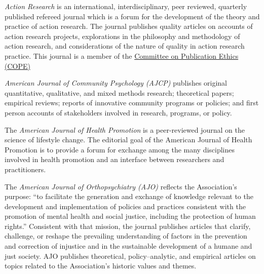 \documentclass[]{tufte-handout}
\providecommand{\tightlist}{%
  \setlength{\itemsep}{0pt}\setlength{\parskip}{0pt}}
\begin{document}
\begin{description}
\tightlist
\item[\href{http://arj.sagepub.com/}{\textsc{Action Research}}.]
\emph{Action Research} is an international, interdisciplinary, peer
reviewed, quarterly published refereed journal which is a forum for the
development of the theory and practice of action research. The journal
publishes quality articles on accounts of action research projects,
explorations in the philosophy and methodology of action research, and
considerations of the nature of quality in action research practice.
This journal is a member of the
\href{http://publicationethics.org/about}{Committee on Publication
Ethics (COPE)}
\item[\href{http://www.scra27.org/publications/ajcp/}{\textsc{American Journal of Community Psychology}}.]
\emph{American Journal of Community Psychology (AJCP)} publishes
original quantitative, qualitative, and mixed methods research;
theoretical papers; empirical reviews; reports of innovative community
programs or policies; and first person accounts of stakeholders involved
in research, programs, or policy.
\item[\href{https://www.healthpromotionjournal.com/}{\textsc{American Journal of Health Promotion}}.]
The \emph{American Journal of Health Promotion} is a peer-reviewed
journal on the science of lifestyle change. The editorial goal of the
American Journal of Health Promotion is to provide a forum for exchange
among the many disciplines involved in health promotion and an interface
between researchers and practitioners.
\item[\href{http://www.apa.org/pubs/journals/ort/}{\textsc{American Journal of Orthopsychiatry}}.]
The \emph{American Journal of Orthopsychiatry (AJO)} reflects the
Association's purpose: ``to facilitate the generation and exchange of
knowledge relevant to the development and implementation of policies and
practices consistent with the promotion of mental health and social
justice, including the protection of human rights.'' Consistent with
that mission, the journal publishes articles that clarify, challenge, or
reshape the prevailing understanding of factors in the prevention and
correction of injustice and in the sustainable development of a humane
and just society. AJO publishes theoretical, policy--analytic, and
empirical articles on topics related to the Association's historic
values and themes.
\item[\href{http://www.ajpmonline.org/home}{\textsc{American Journal of Preventive Medicine }}.]

\end{description}
\end{document}
